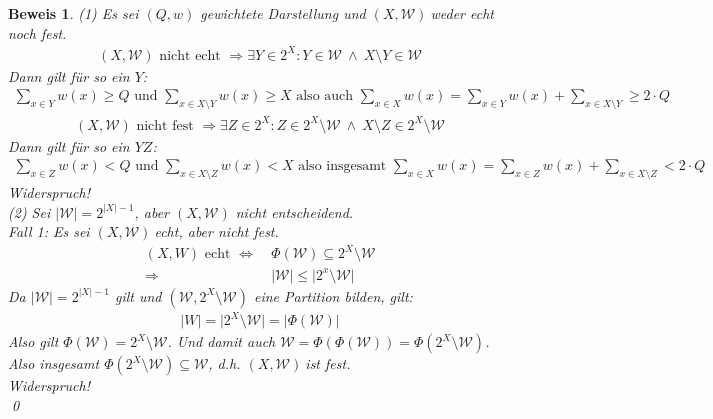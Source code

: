 \documentclass[ngerman]{scrartcl}
\theoremstyle{custom}
\newtheorem*{bw}{Beweis}
\newcommand{\0}{\mathbf{0}}
\newcommand{\1}{\mathbf{L}}
\newcommand{\sg}{$(X,\mathcal{W})~$}
\newcommand{\W}{\mathcal{W}}
\begin{document}
\begin{bw}
(1) Es sei $(Q,w)$ gewichtete Darstellung und \sg weder echt noch
fest.
\begin{align*}
(X,\W) \text{ nicht echt } \Rightarrow \exists Y \in 2^X: Y \in \W
~\wedge~ X \setminus Y \in \W
\end{align*}
Dann gilt f\"ur so ein $Y$:
\begin{align*}
\sum_{x \in Y} w(x) \geq Q \text{ und } \sum_{x \in X \setminus Y}
w(x) \geq X \text{ also auch } \sum_{x \in X} w(x) = \sum_{x \in
  Y} w(x) + \sum_{x \in X \setminus Y} \geq 2 \cdot Q
\end{align*}
\begin{align*}
(X,\W) \text{ nicht fest } \Rightarrow \exists Z \in 2^X: Z \in 2^X
\setminus \W ~\wedge~ X \setminus Z \in 2^X \setminus \W
\end{align*}
Dann gilt f\"ur so ein $YZ$:
\begin{align*}
\sum_{x \in Z} w(x) < Q \text{ und } \sum_{x \in X \setminus Z}
w(x) < X \text{ also insgesamt } \sum_{x \in X} w(x) = \sum_{x \in
  Z} w(x) + \sum_{x \in X \setminus Z} < 2 \cdot Q
\end{align*}
Widerspruch!\\

(2)
Sei $\vert \W \vert = 2^{\vert X \vert -1}$, aber $(X,\W)$ nicht
entscheidend.\\
\emph{Fall 1:} Es sei \sg echt, aber nicht fest.
\begin{align*}
(X,W) \text{ echt } \Leftrightarrow&~ \Phi(\W) \subseteq 2^X \setminus
\W \\
\Rightarrow&~ \vert \W \vert \leq \vert 2^x \setminus \W \vert
\end{align*}
Da $\vert \W \vert = 2^{\vert X \vert -1}$ gilt und $(\W, 2^X \setminus \W)$
eine Partition bilden, gilt:
\begin{align*}
\vert W \vert = \vert 2^X \setminus \W \vert = \vert \Phi(\W) \vert
\end{align*}
Also gilt $\Phi(\W) = 2^X \setminus \W$. Und damit auch $\W =
\Phi(\Phi(\W)) = \Phi(2^X \setminus \W)$. Also insgesamt $\Phi(2^X
\setminus \W) \subseteq \W$, d.h. \sg ist fest.\\
Widerspruch!\\
\qed
\end{bw}
\end{document}
